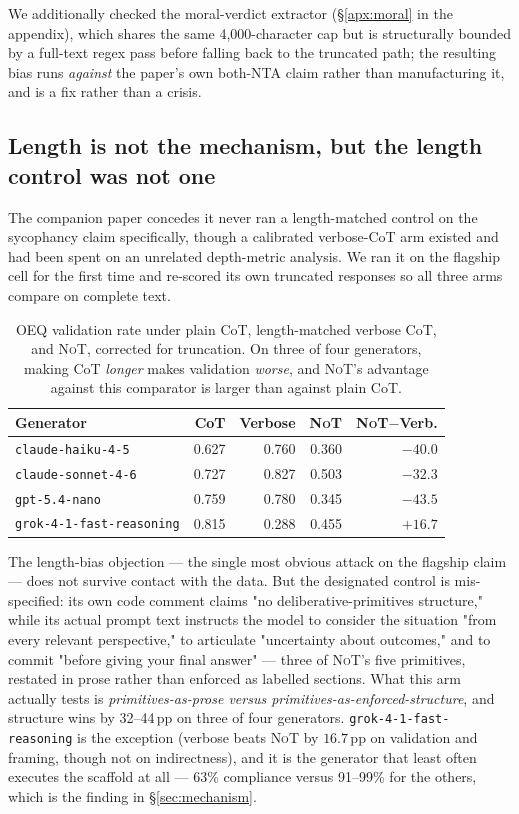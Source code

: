 \documentclass[11pt]{article}
\newcommand{\nano}{\texttt{gpt-5.4-nano}}
\newcommand{\haiku}{\texttt{claude-haiku-4-5}}
\newcommand{\sonnet}{\texttt{claude-sonnet-4-6}}
\newcommand{\grok}{\texttt{grok-4-1-fast-reasoning}}
\newcommand{\NoT}{\textsc{NoT}}
\begin{document}
We additionally checked the moral-verdict extractor (\S\ref{apx:moral} in the
appendix), which shares the same 4{,}000-character cap but is structurally
bounded by a full-text regex pass before falling back to the truncated path; the
resulting bias runs \emph{against} the paper's own both-NTA claim rather than
manufacturing it, and is a fix rather than a crisis.

\subsection{Length is not the mechanism, but the length control was not one}
\label{sec:verbose}

The companion paper concedes it never ran a length-matched control on the
sycophancy claim specifically, though a calibrated verbose-CoT arm existed and
had been spent on an unrelated depth-metric analysis. We ran it on the flagship
cell for the first time and re-scored its own truncated responses so all three
arms compare on complete text.

\begin{table}[t]
\centering
\small
\begin{tabular}{lrrrr}
\toprule
Generator & CoT & Verbose & \NoT & \NoT$-$Verb.\\
\midrule
\haiku{}  & 0.627 & 0.760 & 0.360 & $-40.0$ \\
\sonnet{} & 0.727 & 0.827 & 0.503 & $-32.3$ \\
\nano{}   & 0.759 & 0.780 & 0.345 & $-43.5$ \\
\grok{}   & 0.815 & 0.288 & 0.455 & $+16.7$ \\
\bottomrule
\end{tabular}
\caption{OEQ validation rate under plain CoT, length-matched verbose CoT, and
\NoT{}, corrected for truncation. On three of four generators, making CoT
\emph{longer} makes validation \emph{worse}, and \NoT{}'s advantage against this
comparator is larger than against plain CoT.}
\label{tab:verbose}
\end{table}

The length-bias objection --- the single most obvious attack on the flagship
claim --- does not survive contact with the data. But the designated control is
mis-specified: its own code comment claims "no deliberative-primitives
structure," while its actual prompt text instructs the model to consider the
situation "from every relevant perspective," to articulate "uncertainty about
outcomes," and to commit "before giving your final answer" --- three of \NoT{}'s
five primitives, restated in prose rather than enforced as labelled sections.
What this arm actually tests is \emph{primitives-as-prose versus
primitives-as-enforced-structure}, and structure wins by 32--44\,pp on three of
four generators. \grok{} is the exception (verbose beats \NoT{} by $16.7$\,pp on
validation and framing, though not on indirectness), and it is the generator
that least often executes the scaffold at all --- 63\% compliance versus
91--99\% for the others, which is the finding in \S\ref{sec:mechanism}.
\end{document}
